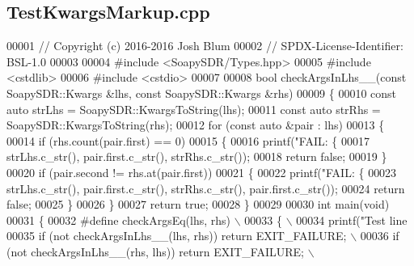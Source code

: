 \subsection{Test\+Kwargs\+Markup.\+cpp}
\label{TestKwargsMarkup_8cpp_source}

\begin{DoxyCode}
00001 \textcolor{comment}{// Copyright (c) 2016-2016 Josh Blum}
00002 \textcolor{comment}{// SPDX-License-Identifier: BSL-1.0}
00003 
00004 \textcolor{preprocessor}{#include <SoapySDR/Types.hpp>}
00005 \textcolor{preprocessor}{#include <cstdlib>}
00006 \textcolor{preprocessor}{#include <cstdio>}
00007 
00008 \textcolor{keywordtype}{bool} checkArgsInLhs__(\textcolor{keyword}{const} SoapySDR::Kwargs &lhs, \textcolor{keyword}{const} SoapySDR::Kwargs &rhs)
00009 \{
00010     \textcolor{keyword}{const} \textcolor{keyword}{auto} strLhs = SoapySDR::KwargsToString(lhs);
00011     \textcolor{keyword}{const} \textcolor{keyword}{auto} strRhs = SoapySDR::KwargsToString(rhs);
00012     \textcolor{keywordflow}{for} (\textcolor{keyword}{const} \textcolor{keyword}{auto} &pair : lhs)
00013     \{
00014         \textcolor{keywordflow}{if} (rhs.count(pair.first) == 0)
00015         \{
00016             printf(\textcolor{stringliteral}{"FAIL: \{%
00017                 strLhs.c\_str(), pair.first.c\_str(), strRhs.c\_str());
00018             \textcolor{keywordflow}{return} \textcolor{keyword}{false};
00019         \}
00020         \textcolor{keywordflow}{if} (pair.second != rhs.at(pair.first))
00021         \{
00022             printf(\textcolor{stringliteral}{"FAIL: \{%
00023                 strLhs.c\_str(), pair.first.c\_str(), strRhs.c\_str(), pair.first.c\_str());
00024             \textcolor{keywordflow}{return} \textcolor{keyword}{false};
00025         \}
00026     \}
00027     \textcolor{keywordflow}{return} \textcolor{keyword}{true};
00028 \}
00029 
00030 \textcolor{keywordtype}{int} main(\textcolor{keywordtype}{void})
00031 \{
00032 \textcolor{preprocessor}{    #define checkArgsEq(lhs, rhs) \(\backslash\)}
00033 \textcolor{preprocessor}{    \{ \(\backslash\)}
00034 \textcolor{preprocessor}{        printf("Test line %
00035 \textcolor{preprocessor}{        if (not checkArgsInLhs\_\_(lhs, rhs)) return EXIT\_FAILURE; \(\backslash\)}
00036 \textcolor{preprocessor}{        if (not checkArgsInLhs\_\_(rhs, lhs)) return EXIT\_FAILURE; \(\backslash\)}
}}}
\end{DoxyCode}
